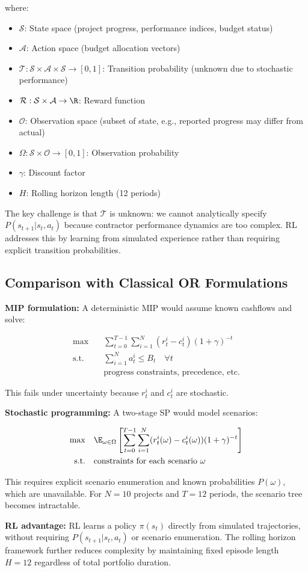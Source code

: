 where:
\begin{itemize}
    \item $\mathcal{S}$: State space (project progress, performance indices, budget status)
    \item $\mathcal{A}$: Action space (budget allocation vectors)
    \item $\mathcal{T}: \mathcal{S} \times \mathcal{A} \times \mathcal{S} \to [0,1]$: Transition probability (unknown due to stochastic performance)
    \item $\mathcal{R}: \mathcal{S} \times \mathcal{A} \to \R$: Reward function
    \item $\mathcal{O}$: Observation space (subset of state, e.g., reported progress may differ from actual)
    \item $\Omega: \mathcal{S} \times \mathcal{O} \to [0,1]$: Observation probability
    \item $\gamma$: Discount factor
    \item $H$: Rolling horizon length (12 periods)
\end{itemize}

The key challenge is that $\mathcal{T}$ is unknown: we cannot analytically specify $P(s_{t+1} | s_t, a_t)$ because contractor performance dynamics are too complex. RL addresses this by learning from simulated experience rather than requiring explicit transition probabilities.

\subsection{Comparison with Classical OR Formulations}

\textbf{MIP formulation:} A deterministic MIP would assume known cashflows and solve:

\begin{align}
\max \quad & \sum_{t=0}^{T-1} \sum_{i=1}^N (r_t^i - c_t^i) (1+\gamma)^{-t} \\
\text{s.t.} \quad & \sum_{i=1}^N a_t^i \leq B_t \quad \forall t \\
& \text{progress constraints, precedence, etc.}
\end{align}

This fails under uncertainty because $r_t^i$ and $c_t^i$ are stochastic.

\textbf{Stochastic programming:} A two-stage SP would model scenarios:

\begin{align}
\max \quad & \E_{\omega \in \Omega} \left[\sum_{t=0}^{T-1} \sum_{i=1}^N (r_t^i(\omega) - c_t^i(\omega)) (1+\gamma)^{-t}\right] \\
\text{s.t.} \quad & \text{constraints for each scenario } \omega
\end{align}

This requires explicit scenario enumeration and known probabilities $P(\omega)$, which are unavailable. For $N=10$ projects and $T=12$ periods, the scenario tree becomes intractable.

\textbf{RL advantage:} RL learns a policy $\pi(s_t)$ directly from simulated trajectories, without requiring $P(s_{t+1}|s_t, a_t)$ or scenario enumeration. The rolling horizon framework further reduces complexity by maintaining fixed episode length $H=12$ regardless of total portfolio duration.
